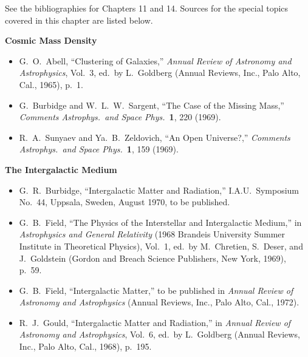 %


See the bibliographies for Chapters 11 and 14. Sources for the special topics
covered in this chapter are listed below.

\medskip
\noindent\textbf{Cosmic Mass Density}\par
\begin{itemize}
  \item[\(\square\)] G.~O.~Abell, ``Clustering of Galaxies,''
  \emph{Annual Review of Astronomy and Astrophysics}, Vol.~3,
  ed.\ by L.~Goldberg (Annual Reviews, Inc., Palo Alto, Cal., 1965), p.~1.

  \item[\(\square\)] G.~Burbidge and W.~L.~W.~Sargent,
  ``The Case of the Missing Mass,''
  \emph{Comments Astrophys.\ and Space Phys.}\ \textbf{1}, 220 (1969).

  \item[\(\square\)] R.~A.~Sunyaev and Ya.~B.~Zeldovich,
  ``An Open Universe?,'' \emph{Comments Astrophys.\ and Space Phys.}\
  \textbf{1}, 159 (1969).
\end{itemize}

\medskip
\noindent\textbf{The Intergalactic Medium}\par
\begin{itemize}
  \item[\(\square\)] G.~R.~Burbidge,
  ``Intergalactic Matter and Radiation,'' I.A.U.\ Symposium No.~44,
  Uppsala, Sweden, August 1970, to be published.

  \item[\(\square\)] G.~B.~Field,
  ``The Physics of the Interstellar and Intergalactic Medium,'' in
  \emph{Astrophysics and General Relativity}
  (1968 Brandeis University Summer Institute in Theoretical Physics),
  Vol.~1, ed.\ by M.~Chretien, S.~Deser, and J.~Goldstein
  (Gordon and Breach Science Publishers, New York, 1969), p.~59.

  \item[\(\square\)] G.~B.~Field, ``Intergalactic Matter,'' to be published
  in \emph{Annual Review of Astronomy and Astrophysics}
  (Annual Reviews, Inc., Palo Alto, Cal., 1972).

  \item[\(\square\)] R.~J.~Gould,
  ``Intergalactic Matter and Radiation,'' in
  \emph{Annual Review of Astronomy and Astrophysics}, Vol.~6,
  ed.\ by L.~Goldberg (Annual Reviews, Inc., Palo Alto, Cal., 1968), p.~195.
\end{itemize}

